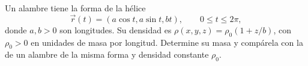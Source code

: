 Un alambre tiene la forma de la hélice
\[
\vec r(t)=(a\cos t,a\sin t,bt),\qquad 0\leq t\leq2\pi,
\]
donde $a,b>0$ son longitudes. Su densidad es $\rho(x,y,z)=\rho_0(1+z/b)$, con $\rho_0>0$ en unidades de masa por longitud. Determine su masa y compárela con la de un alambre de la misma forma y densidad constante $\rho_0$.
